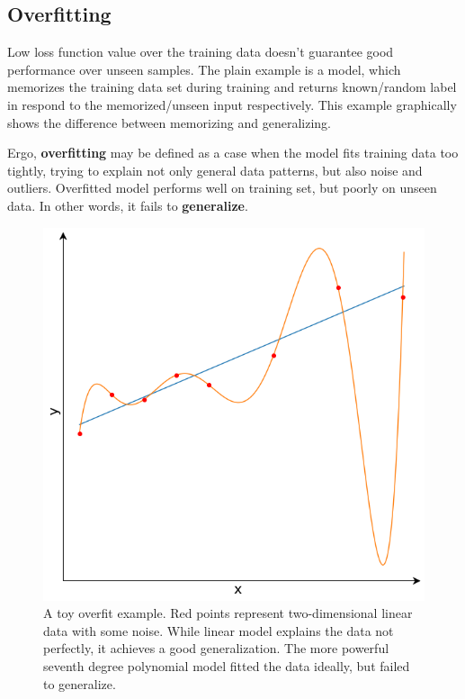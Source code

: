 \documentclass[thesis=B,english]{FITthesis}[2019/12/23]
\begin{document}
	\subsection{Overfitting}
	
	Low loss function value over the training data doesn't guarantee good performance over unseen samples. The plain example is a model, which memorizes the training data set during training and returns known/random label in respond to the memorized/unseen input respectively. This example graphically shows the difference between memorizing and generalizing.
	
	Ergo, \textbf{overfitting} may be defined as a case when the model fits training data too tightly, trying to explain not only general data patterns, but also noise and outliers. Overfitted model performs well on training set, but poorly on unseen data. In other words, it fails to \textbf{generalize}.
	
	\begin{figure}[h]
		\includegraphics[scale=0.35]{images/overfit.png}
		\centering
		\caption{A toy overfit example. Red points represent two-dimensional linear data with some noise. While linear model explains the data not perfectly, it achieves a good generalization. The more powerful seventh degree polynomial model fitted the data ideally, but failed to generalize. }
	\end{figure}
	
\end{document}
